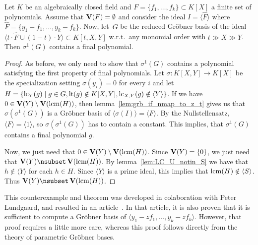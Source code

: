 \begin{theorem}
  Let $K$ be an algebraically closed field and $F = \{f_{1}, \dots, f_{k}\} \subset K[X]$ a finite set of polynomials. Assume that $\operatorname{\mathbf V}(F) = \emptyset$ and consider the ideal $I = \langle \hat F \rangle$ where $\hat F = \{y_{1} - f_{1}, \dots, y_{k} - f_{k}\}$. Now, let $\,G$ be the reduced Gröbner basis of the ideal $\langle t \cdot \hat F \cup (1 - t) \cdot Y \rangle \subset K[t, X, Y]$ w.r.t.\ any monomial order with $t \gg X \gg Y$. Then $\sigma^{1}(G)$ contains a final polynomial.
\end{theorem}
\begin{proof}
  As before, we only need to show that $\sigma^{1}(G)$ contains a polynomial satisfying the first property of final polynomials. Let $\sigma : K[X, Y] \to K[X]$ be the specialization setting $\sigma(y_{i}) = 0$ for every $i$ and let $H = \{\operatorname{lc}_{Y}(g) \mid g \in G, \operatorname{lt}(g) \notin K[X, Y], \operatorname{lc}_{X, Y}(g) \notin \langle Y \rangle\}$. If we have $0 \in \operatorname{\mathbf V}(Y) \setminus \operatorname{\mathbf V}(\operatorname{lcm}(H))$, then lemma~\ref{lem:grb_if_nmap_to_z_t} gives us that $\sigma(\sigma^{1}(G))$ is a Gröbner basis of $\langle \sigma(I) \rangle = \langle F \rangle$. By the Nullstellensatz, $\langle F \rangle = \langle 1 \rangle$, so $\sigma(\sigma^{1}(G))$ has to contain a constant. This implies, that $\sigma^{1}(G)$ contains a final polynomial $g$.

  Now, we just need that $0 \in \operatorname{\mathbf V}(Y) \setminus \operatorname{\mathbf V}(\operatorname{lcm}(H))$. Since $\operatorname{\mathbf V}(Y) = \{0\}$, we just need that $\V(Y) \nsubset \V(\lcm(H))$. By lemma~\ref{lem:LC_U_notin_S} we have that $h \notin \langle Y \rangle$ for each $h \in H$. Since $\langle Y \rangle$ is a prime ideal, this implies that $\operatorname{lcm}(H) \notin \langle S \rangle$. Thus $\V(Y) \nsubset \V(\lcm(H))$.
\end{proof}

This counterexample and theorem was developed in colaboration with Peter Lundgaard, and resulted in an article~\cite{Lundgaard_Poulsen}. In that article, it is also proven that it is sufficient to compute a Gröbner basis of $\langle y_{1} - z f_{1}, \dots, y_{k} - z f_{k} \rangle$. However, that proof requires a little more care, whereas this proof follows directly from the theory of parametric Gröbner bases.
